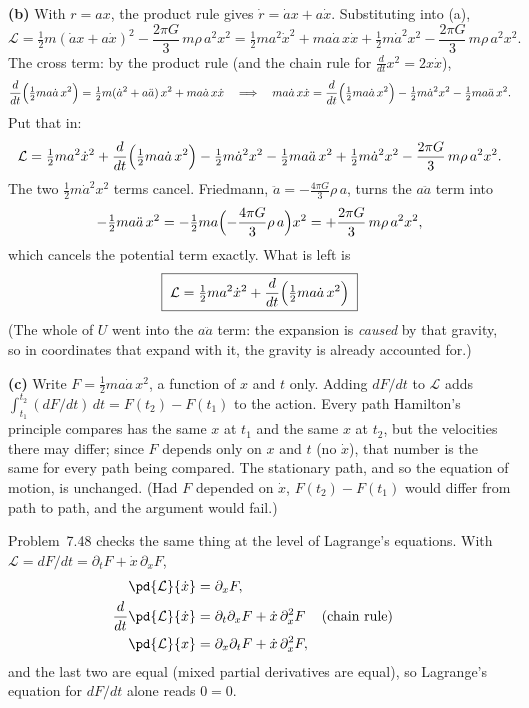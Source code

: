 \documentclass[12pt]{article}
\numberwithin{equation}{section}
\newcommand{\Lag}{\mathcal{L}}
\begin{document}
\medskip
\noindent\textbf{(b)} With $r = ax$, the product rule gives $\dot r = \dot a x + a\dot x$. Substituting
into (a),
\[
  \Lag = \tfrac12 m(\dot a x + a\dot x)^2 - \frac{2\pi G}{3}\, m\rho\, a^2 x^2
  = \tfrac12 m a^2\dot x^2 + m a\dot a\, x\dot x + \tfrac12 m\dot a^2 x^2 - \frac{2\pi G}{3}\, m\rho\, a^2 x^2 .
\]
The cross term: by the product rule (and the chain rule for $\frac{d}{dt}x^2 = 2x\dot x$),
\[
  \frac{d}{dt}\Bigl(\tfrac12 m a\dot a\,x^2\Bigr)
  = \tfrac12 m(\dot a^2 + a\ddot a)\,x^2 + m a\dot a\,x\dot x
  \quad\Longrightarrow\quad
  m a\dot a\,x\dot x = \frac{d}{dt}\Bigl(\tfrac12 m a\dot a\,x^2\Bigr) - \tfrac12 m\dot a^2 x^2 - \tfrac12 m a\ddot a\,x^2 .
\]
Put that in:
\[
  \Lag = \tfrac12 m a^2\dot x^2 + \frac{d}{dt}\Bigl(\tfrac12 m a\dot a\,x^2\Bigr)
  - \tfrac12 m\dot a^2 x^2 - \tfrac12 m a\ddot a\,x^2 + \tfrac12 m\dot a^2 x^2 - \frac{2\pi G}{3}\, m\rho\, a^2 x^2 .
\]
The two $\tfrac12 m\dot a^2 x^2$ terms cancel. Friedmann, $\ddot a = -\frac{4\pi G}{3}\rho\,a$,
turns the $a\ddot a$ term into
\[
  -\tfrac12 m a\ddot a\,x^2 = -\tfrac12 m a\Bigl(-\frac{4\pi G}{3}\rho\,a\Bigr)x^2
  = +\frac{2\pi G}{3}\,m\rho\,a^2x^2 ,
\]
which cancels the potential term exactly. What is left is
\[
  \boxed{\;\Lag = \tfrac12 m a^2\dot x^2 + \frac{d}{dt}\Bigl(\tfrac12 m a\dot a\,x^2\Bigr)\;}
\]
(The whole of $U$ went into the $a\ddot a$ term: the expansion is \emph{caused} by that
gravity, so in coordinates that expand with it, the gravity is already accounted for.)

\medskip
\noindent\textbf{(c)} Write $F = \tfrac12 m a\dot a\,x^2$, a function of $x$ and $t$ only. Adding $dF/dt$
to $\Lag$ adds $\int_{t_1}^{t_2}(dF/dt)\,dt = F(t_2) - F(t_1)$ to the action. Every path
Hamilton's principle compares has the same $x$ at $t_1$ and the same $x$ at $t_2$, but the
velocities there may differ; since $F$ depends only on $x$ and $t$ (no $\dot x$), that number is
the same for every path being compared. The stationary path, and so the equation of motion, is
unchanged. (Had $F$ depended on $\dot x$, $F(t_2) - F(t_1)$ would differ from path to path, and
the argument would fail.)

Problem~7.48 checks the same thing at the level of Lagrange's equations. With
$\Lag = dF/dt = \partial_t F + \dot x\,\partial_x F$,
\begin{align*}
  \pd{\Lag}{\dot x} &= \partial_x F,\\
  \frac{d}{dt}\pd{\Lag}{\dot x} &= \partial_t\partial_x F + \dot x\,\partial_x^2 F
  && \text{(chain rule)}\\
  \pd{\Lag}{x} &= \partial_x\partial_t F + \dot x\,\partial_x^2 F ,
\end{align*}
and the last two are equal (mixed partial derivatives are equal), so Lagrange's equation for
$dF/dt$ alone reads $0 = 0$.
\end{document}
